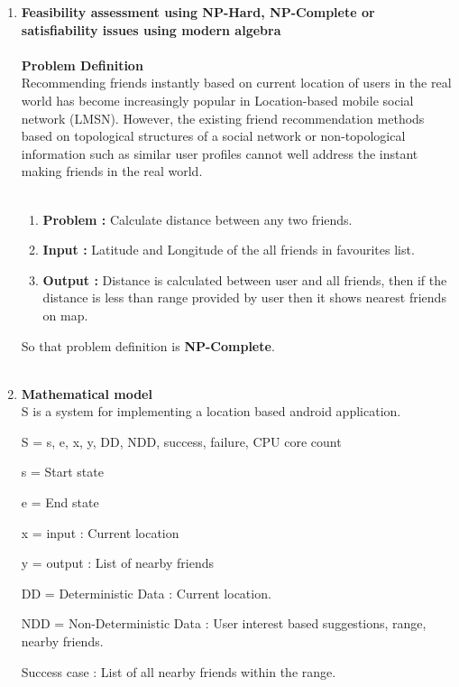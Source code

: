 \begin{enumerate}
\item\textbf{Feasibility assessment using NP-Hard, NP-Complete or satisfiability issues using modern algebra}\\
\\
\textbf{Problem Definition}\\
\hspace*{0.3in} Recommending friends instantly based on current location of users in the real world has become increasingly popular in Location-based mobile social network (LMSN). However, the existing friend recommendation methods based on topological structures of a social network or non-topological information such as similar user profiles cannot well address the instant making friends in the real world.\\
\\

\begin{enumerate}
\item\textbf{Problem :} Calculate distance between any two friends.\\
\item\textbf{Input : } Latitude and Longitude of the all friends in favourites list.
\item\textbf{Output : } Distance is calculated between user and all friends, then if the distance is less than range provided by user then it shows nearest friends on map. 
\end{enumerate}
  
So that problem definition is \textbf{NP-Complete}.\\
\\
\item\textbf{Mathematical model}\\
S is a system for implementing a location based android application.

S = {s, e, x, y, DD, NDD, success, failure, CPU core count} 

s = Start state

e = End state

x = input : Current location

y = output : List of nearby friends

DD = Deterministic Data : Current location.

NDD = Non-Deterministic Data : User interest based suggestions, range, nearby friends.

Success case : List of all nearby friends within the range.


\end{enumerate}
